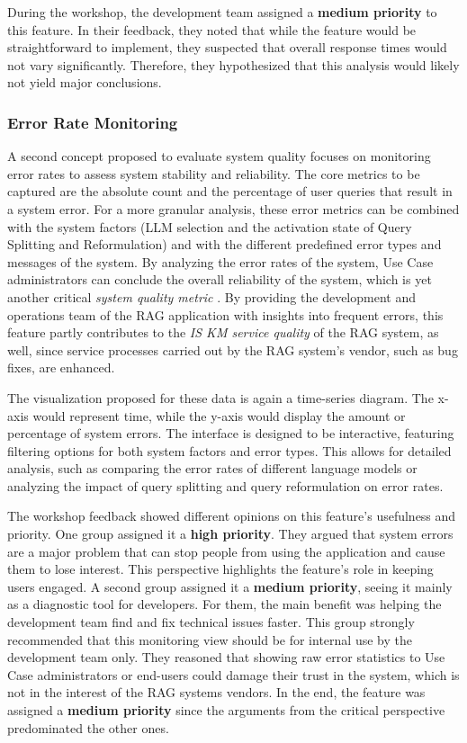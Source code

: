 \documentclass[
	english,
	ruledheaders=section,%
	class=report,%
	thesis={type=bachelor},%
	accentcolor=1b,%
	custommargins=true,%
	marginpar=false,%
	parskip=half-,%
	fontsize=11pt,%
	DIV=14,
]{tudapub}
\begin{document}
During the workshop, the development team assigned a \textbf{medium priority} to this feature. In their feedback, they noted that while the feature would be straightforward to implement, they suspected that overall response times would not vary significantly. Therefore, they hypothesized that this analysis would likely not yield major conclusions.

\subsubsection{Error Rate Monitoring}
A second concept proposed to evaluate system quality focuses on monitoring error rates to assess system stability and reliability. The core metrics to be captured are the absolute count and the percentage of user queries that result in a system error. For a more granular analysis, these error metrics can be combined with the system factors (LLM selection and the activation state of Query Splitting and Reformulation) and with the different predefined error types and messages of the system. By analyzing the error rates of the system, Use Case administrators can conclude the overall reliability of the system, which is yet another critical \textit{system quality metric} \parencite[p.~64]{DeloneMcLean1992ISSuccess}. By providing the development and operations team of the RAG application with insights into frequent errors, this feature partly contributes to the \textit{IS KM service quality} \parencite[pp.~58--59]{Jennex2006} of the RAG system, as well, since service processes carried out by the RAG system's vendor, such as bug fixes, are enhanced.

The visualization proposed for these data is again a time-series diagram. The x-axis would represent time, while the y-axis would display the amount or percentage of system errors. The interface is designed to be interactive, featuring filtering options for both system factors and error types. This allows for detailed analysis, such as comparing the error rates of different language models or analyzing the impact of query splitting and query reformulation on error rates.

The workshop feedback showed different opinions on this feature's usefulness and priority. One group assigned it a \textbf{high priority}. They argued that system errors are a major problem that can stop people from using the application and cause them to lose interest. This perspective highlights the feature's role in keeping users engaged. A second group assigned it a \textbf{medium priority}, seeing it mainly as a diagnostic tool for developers. For them, the main benefit was helping the development team find and fix technical issues faster. This group strongly recommended that this monitoring view should be for internal use by the development team only. They reasoned that showing raw error statistics to Use Case administrators or end-users could damage their trust in the system, which is not in the interest of the RAG systems vendors. In the end, the feature was assigned a \textbf{medium priority} since the arguments from the critical perspective predominated the other ones.
\end{document}
